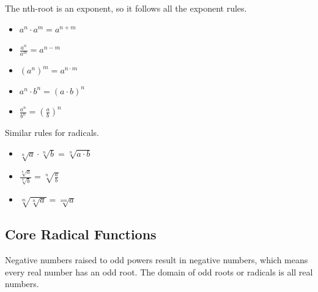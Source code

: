 \documentclass{ximera}
\begin{document}
The nth-root is an exponent, so it follows all the exponent rules.


\begin{itemize}
\item $a^n \cdot a^m = a^{n+m}$

\item $\frac{a^n}{a^m} = a^{n-m}$

\item $(a^n)^m = a^{n \cdot m}$

\item $a^n \cdot b^n = (a \cdot b)^n$

\item $\frac{a^n}{b^n} = \left(\frac{a}{b}\right)^n$


\end{itemize}



Similar rules for radicals.

\begin{itemize}

\item $\sqrt[n]{a} \cdot \sqrt[n]{b} = \sqrt[n]{a \cdot b}$

\item $\frac{\sqrt[n]{a}}{\sqrt[n]{b}} = \sqrt[n]{\frac{a}{b}}$

\item $\sqrt[m]{\sqrt[n]{a}} = \sqrt[nm]{a}$

\end{itemize}





















\subsection*{Core Radical Functions}



Negative numbers raised to odd powers result in negative numbers, which means every real number has an odd root.  The domain of odd roots or radicals is all real numbers.
\end{document}

